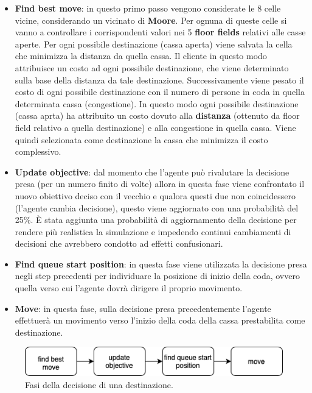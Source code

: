 \begin{itemize}
    \item \textbf{Find best move}: in questo primo passo vengono considerate le 8 celle vicine, considerando un vicinato di \textbf{Moore}. Per ognuna di queste celle si vanno a controllare i corrispondenti valori nei 5 \textbf{floor fields} relativi alle casse aperte. Per ogni possibile destinazione (cassa aperta) viene salvata la cella che minimizza la distanza da quella cassa. Il cliente in questo modo attribuisce un costo ad ogni possibile destinazione, che viene determinato sulla base della distanza da tale destinazione. Successivamente viene pesato il costo di ogni possibile destinazione con il numero di persone in coda in quella determinata cassa (congestione). In questo modo ogni possibile destinazione (cassa aprta) ha attribuito un costo dovuto alla \textbf{distanza} (ottenuto da floor field relativo a quella destinazione) e alla congestione in quella cassa. Viene quindi selezionata come destinazione la cassa che minimizza il costo complessivo.  
    \item \textbf{Update objective}: dal momento che l'agente può rivalutare la decisione presa (per un numero finito di volte) allora in questa fase viene confrontato il nuovo obiettivo deciso con il vecchio e qualora questi due non coincidessero (l'agente cambia decisione), questo viene aggiornato con una probabilità del 25\%. È stata aggiunta una probabilità di aggiornamento della decisione per rendere più realistica la simulazione e impedendo continui cambiamenti di decisioni che avrebbero condotto ad effetti confusionari.
    \item \textbf{Find queue start position}: in questa fase viene utilizzata la decisione presa negli step precedenti per individuare la posizione di inizio della coda, ovvero quella verso cui l'agente dovrà dirigere il proprio movimento.
    \item \textbf{Move}: in questa fase, sulla decisione presa precedentemente l'agente effettuerà un movimento verso l'inizio della coda della cassa prestabilita come destinazione.
\end{itemize}

\begin{figure}[h!]
    \includegraphics[width=\linewidth]{img/decision-classic.png}
    \centering
    \caption{Fasi della decisione di una destinazione.}
\end{figure}

